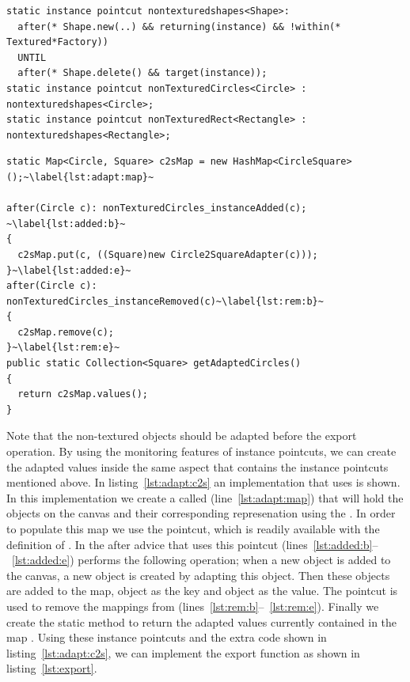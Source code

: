 \begin{lstlisting}[float, label={lst:nts}, caption={Instance pointcuts that select non-textured shapes in the canvas}]
static instance pointcut nontexturedshapes<Shape>: 
  after(* Shape.new(..) && returning(instance) && !within(* Textured*Factory)) 
  UNTIL
  after(* Shape.delete() && target(instance));
static instance pointcut nonTexturedCircles<Circle> : nontexturedshapes<Circle>;
static instance pointcut nonTexturedRect<Rectangle> : nontexturedshapes<Rectangle>;
\end{lstlisting}





\begin{lstlisting}[float,  caption={Adapting non-textured \lstinln{Circle} objects to \lstinln{Square} objects}, label={lst:adapt:c2s}]
static Map<Circle, Square> c2sMap = new HashMap<CircleSquare>();~\label{lst:adapt:map}~

after(Circle c): nonTexturedCircles_instanceAdded(c); ~\label{lst:added:b}~
{
  c2sMap.put(c, ((Square)new Circle2SquareAdapter(c)));
}~\label{lst:added:e}~
after(Circle c): nonTexturedCircles_instanceRemoved(c)~\label{lst:rem:b}~
{
  c2sMap.remove(c);
}~\label{lst:rem:e}~
public static Collection<Square> getAdaptedCircles()
{
  return c2sMap.values();
}
\end{lstlisting}

Note that the non-textured  objects should be adapted before the export operation.
By using the monitoring features of instance pointcuts, we can create the adapted values inside the same aspect that contains the instance pointcuts mentioned above.
In listing~\ref{lst:adapt:c2s} an implementation that uses  is shown. 
In this implementation we create a  called  (line~\ref{lst:adapt:map}) that will hold the  objects on the canvas and their corresponding  represenation using the .
In order to populate this map we use the  pointcut, which is readily available with the definition of .
In the after advice that uses this pointcut (lines~\ref{lst:added:b}--~\ref{lst:added:e}) performs the following operation; when a new  object is added to the canvas, a new  object is created by adapting this  object.
Then these objects are added to the map,  object as the key and  object as the value.
The  pointcut is used to remove the mappings from  (lines~\ref{lst:rem:b}--~\ref{lst:rem:e}). 
Finally we create the static method  to return the adapted values currently contained in the map .
Using these instance pointcuts and the extra code shown in listing~\ref{lst:adapt:c2s}, we can implement the export function as shown in listing~\ref{lst:export}.

